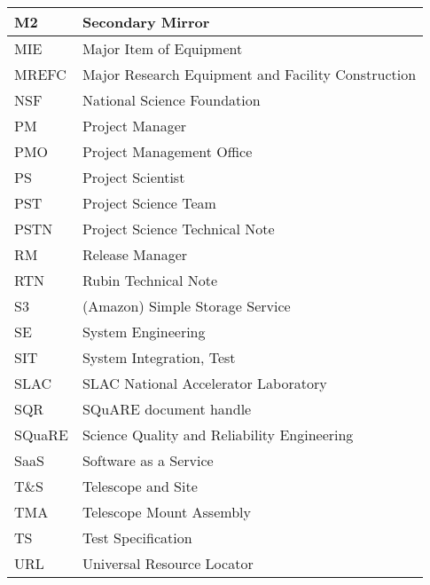 \begin{longtable}{p{}p{}}
M2 & Secondary Mirror \\\hline
MIE & Major Item of Equipment \\\hline
MREFC & Major Research Equipment and Facility Construction \\\hline
NSF & National Science Foundation \\\hline
PM & Project Manager \\\hline
PMO & Project Management Office \\\hline
PS & Project Scientist \\\hline
PST & Project Science Team \\\hline
PSTN & Project Science Technical Note \\\hline
RM & Release Manager \\\hline
RTN & Rubin Technical Note \\\hline
S3 & (Amazon) Simple Storage Service  \\\hline
SE & System Engineering \\\hline
SIT & System Integration, Test \\\hline
SLAC & SLAC National Accelerator Laboratory \\\hline
SQR & SQuARE document handle \\\hline
SQuaRE & Science Quality and Reliability Engineering \\\hline
SaaS & Software as a Service \\\hline
T\&S & Telescope and Site \\\hline
TMA & Telescope Mount Assembly \\\hline
TS & Test Specification \\\hline
URL & Universal Resource Locator \\\hline
\end{longtable}
